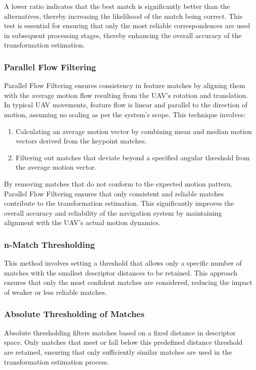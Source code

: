 A lower ratio indicates that the best match is significantly better than the alternatives, thereby increasing the likelihood of the match being correct. This test is essential for ensuring that only the most reliable correspondences are used in subsequent processing stages, thereby enhancing the overall accuracy of the transformation estimation.

\subsubsection{Parallel Flow Filtering}

Parallel Flow Filtering ensures consistency in feature matches by aligning them with the average motion flow resulting from the UAV's rotation and translation. In typical UAV movements, feature flow is linear and parallel to the direction of motion, assuming no scaling as per the system's scope. This technique involves:

\begin{enumerate}
    \item Calculating an average motion vector by combining mean and median motion vectors derived from the keypoint matches. 
    \item Filtering out matches that deviate beyond a specified angular threshold from the average motion vector.
\end{enumerate}

By removing matches that do not conform to the expected motion pattern, Parallel Flow Filtering ensures that only consistent and reliable matches contribute to the transformation estimation. This significantly improves the overall accuracy and reliability of the navigation system by maintaining alignment with the UAV's actual motion dynamics.

\subsubsection{n-Match Thresholding}
This method involves setting a threshold that allows only a specific number of matches with the smallest descriptor distances to be retained. This approach ensures that only the most confident matches are considered, reducing the impact of weaker or less reliable matches.

\subsubsection{Absolute Thresholding of Matches}

Absolute thresholding filters matches based on a fixed distance in descriptor space. Only matches that meet or fall below this predefined distance threshold are retained, ensuring that only sufficiently similar matches are used in the transformation estimation process.

